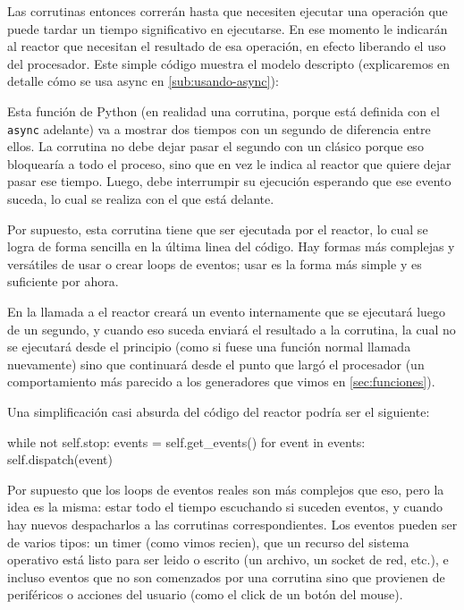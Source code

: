 Las corrutinas entonces correrán hasta que necesiten ejecutar una operación que puede tardar un tiempo significativo en ejecutarse. En ese momento le indicarán al reactor que necesitan el resultado de esa operación, en efecto liberando el uso del procesador. Este simple código muestra el modelo descripto (explicaremos en detalle cómo se usa async en \ref{sub:usando-async}):


Esta función de Python (en realidad una corrutina, porque está definida con el \texttt{async} adelante) va a mostrar dos tiempos con un segundo de diferencia entre ellos. La corrutina no debe dejar pasar el segundo con un  clásico porque eso bloquearía a todo el proceso, sino que en vez le indica al reactor que quiere dejar pasar ese tiempo. Luego, debe interrumpir su ejecución esperando que ese evento suceda, lo cual se realiza con el  que está delante.

Por supuesto, esta corrutina tiene que ser ejecutada por el reactor, lo cual se logra de forma sencilla en la última linea del código. Hay formas más complejas y versátiles de usar o crear loops de eventos; usar  es la forma más simple y es suficiente por ahora.

En la llamada a  el reactor creará un evento internamente que se ejecutará luego de un segundo, y cuando eso suceda enviará el resultado a la corrutina, la cual no se ejecutará desde el principio (como si fuese una función normal llamada nuevamente) sino que continuará desde el punto que largó el procesador (un comportamiento más parecido a los generadores que vimos en \ref{sec:funciones}).

Una simplificación casi absurda del código del reactor podría ser el siguiente:

\begin{py}
while not self.stop:
    events = self.get_events()
    for event in events:
        self.dispatch(event)
\end{py}

Por supuesto que los loops de eventos reales son más complejos que eso, pero la idea es la misma: estar todo el tiempo escuchando si suceden eventos, y cuando hay nuevos despacharlos a las corrutinas correspondientes. Los eventos pueden ser de varios tipos: un timer (como vimos recien), que un recurso del sistema operativo está listo para ser leido o escrito (un archivo, un socket de red, etc.), e incluso eventos que no son comenzados por una corrutina sino que provienen de periféricos o acciones del usuario (como el click de un botón del mouse).

